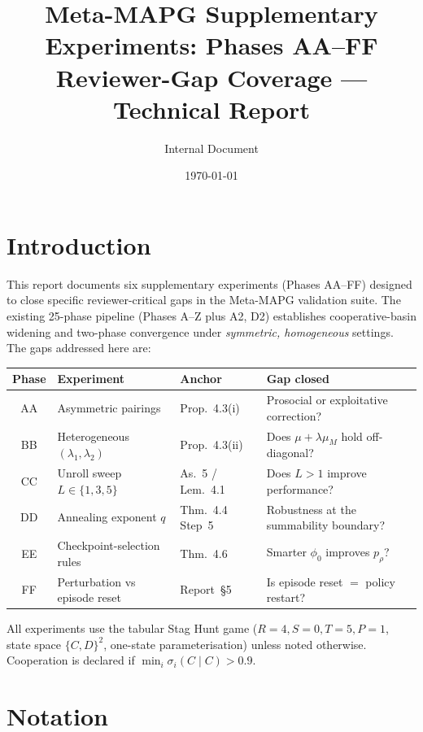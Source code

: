 \documentclass[11pt,a4paper]{article}
\title{Meta-MAPG Supplementary Experiments: Phases AA--FF\\
\large Reviewer-Gap Coverage --- Technical Report}
\author{Internal Document}
\date{\today}
\begin{document}
\maketitle
\tableofcontents
\clearpage

\section{Introduction}
\label{sec:intro}

This report documents six supplementary experiments (Phases AA--FF) designed
to close specific reviewer-critical gaps in the Meta-MAPG validation suite.
The existing 25-phase pipeline (Phases A--Z plus A2, D2) establishes
cooperative-basin widening and two-phase convergence under \emph{symmetric,
homogeneous} settings. The gaps addressed here are:

\begin{center}
\begin{tabular}{@{}cl@{\quad}l@{\quad}p{5.2cm}@{}}
\toprule
Phase & Experiment & Anchor & Gap closed \\
\midrule
AA & Asymmetric pairings & Prop.~4.3(i) & Prosocial or exploitative correction? \\
BB & Heterogeneous $(\lambda_1,\lambda_2)$ & Prop.~4.3(ii) & Does $\mu+\lambda\mu_M$ hold off-diagonal? \\
CC & Unroll sweep $L\in\{1,3,5\}$ & As.~5 / Lem.~4.1 & Does $L>1$ improve performance? \\
DD & Annealing exponent $q$ & Thm.~4.4 Step~5 & Robustness at the summability boundary? \\
EE & Checkpoint-selection rules & Thm.~4.6 & Smarter $\phi_0$ improves $p_\rho$? \\
FF & Perturbation vs episode reset & Report~\S5 & Is episode reset $=$ policy restart? \\
\bottomrule
\end{tabular}
\end{center}

All experiments use the tabular Stag Hunt game ($R=4,S=0,T=5,P=1$, state
space $\{C,D\}^2$, one-state parameterisation) unless noted otherwise.
Cooperation is declared if $\min_i \sigma_i(C\mid C)>0.9$.

\section{Notation}
\label{sec:notation}
\end{document}

